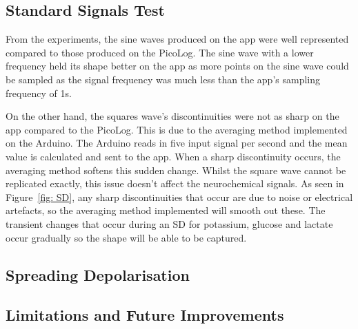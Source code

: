 \subsection{Standard Signals Test}

From the experiments, the sine waves produced on the app were well represented compared to those produced on the PicoLog. The sine wave with a lower frequency held its shape better on the app as more points on the sine wave could be sampled as the signal frequency was much less than the app's sampling frequency of 1s. 

On the other hand, the squares wave's discontinuities were not as sharp on the app compared to the PicoLog. This is due to the averaging method implemented on the Arduino. The Arduino reads in five input signal per second and the mean value is calculated and sent to the app. When a sharp discontinuity occurs, the averaging method softens this sudden change. Whilst the square wave cannot be replicated exactly, this issue doesn't affect the neurochemical signals. As seen in Figure~\ref{fig: SD}, any sharp discontinuities that occur are due to noise or electrical artefacts, so the averaging method implemented will smooth out these. The transient changes that occur during an SD for potassium, glucose and lactate occur gradually so the shape will be able to be captured.



\subsection{Spreading Depolarisation}

\subsection{Limitations and Future Improvements}

